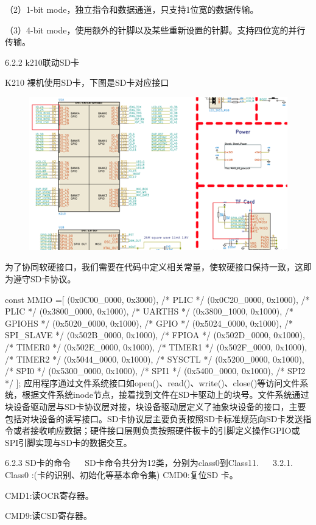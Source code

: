 （2）1-bit mode，独⽴指令和数据通道，只⽀持1位宽的数据传输。

（3）4-bit mode，使⽤额外的针脚以及某些重新设置的针脚。⽀持四位宽的并⾏传输。

6.2.2 k210联动SD卡

K210 裸机使用SD卡，下图是SD卡对应接口
\begin{figure}[H]
    \centering
    \includegraphics{figures/06-02-接口标.png}
\end{figure}

为了协同软硬接口，我们需要在代码中定义相关常量，使软硬接口保持一致，这即为遵守SD卡协议。

const MMIO =[
(0x0C00_0000, 0x3000), /* PLIC */
(0x0C20_0000, 0x1000), /* PLIC */
(0x3800_0000, 0x1000), /* UARTHS */
(0x3800_1000, 0x1000), /* GPIOHS */
(0x5020_0000, 0x1000), /* GPIO */
(0x5024_0000, 0x1000), /* SPI_SLAVE */
(0x502B_0000, 0x1000), /* FPIOA */
(0x502D_0000, 0x1000), /* TIMER0 */
(0x502E_0000, 0x1000), /* TIMER1 */
(0x502F_0000, 0x1000), /* TIMER2 */
(0x5044_0000, 0x1000), /* SYSCTL */
(0x5200_0000, 0x1000), /* SPI0 */
(0x5300_0000, 0x1000), /* SPI1 */
(0x5400_0000, 0x1000), /* SPI2 */
];
应⽤程序通过⽂件系统接⼝如open()、read()、write()、close()等访问⽂件系统，根据⽂件系统inode节点，接着找到⽂件在SD卡驱动上的块号。⽂件系统通过块设备驱动层与SD卡协议层对接，块设备驱动层定义了抽象块设备的接⼝，主要包括对块设备的读写接⼝。SD卡协议层主要负责按照SD卡标准规范向SD卡发送指令或者接收响应数据；硬件接⼝层则负责按照硬件板卡的引脚定义操作GPIO或SPI引脚实现与SD卡的数据交互。

6.2.3 SD卡的命令
　
SD卡命令共分为12类，分别为class0到Class11.
　
3.2.1. Class0 :(卡的识别、初始化等基本命令集)
CMD0:复位SD 卡。

CMD1:读OCR寄存器。

CMD9:读CSD寄存器。

